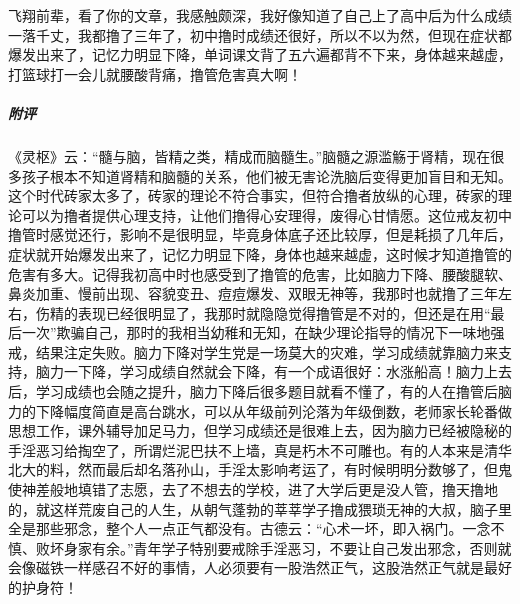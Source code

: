 \begin{case}
    飞翔前辈，看了你的文章，我感触颇深，我好像知道了自己上了高中后为什么成绩一落千丈，我都撸了三年了，初中撸时成绩还很好，所以不以为然，但现在症状都爆发出来了，记忆力明显下降，单词课文背了五六遍都背不下来，身体越来越虚，打篮球打一会儿就腰酸背痛，撸管危害真大啊！
    \subparagraph{附评} 《灵枢》云：“髓与脑，皆精之类，精成而脑髓生。”脑髓之源滥觞于肾精，现在很多孩子根本不知道肾精和脑髓的关系，他们被无害论洗脑后变得更加盲目和无知。这个时代砖家太多了，砖家的理论不符合事实，但符合撸者放纵的心理，砖家的理论可以为撸者提供心理支持，让他们撸得心安理得，废得心甘情愿。这位戒友初中撸管时感觉还行，影响不是很明显，毕竟身体底子还比较厚，但是耗损了几年后，症状就开始爆发出来了，记忆力明显下降，身体也越来越虚，这时候才知道撸管的危害有多大。记得我初高中时也感受到了撸管的危害，比如脑力下降、腰酸腿软、鼻炎加重、慢前出现、容貌变丑、痘痘爆发、双眼无神等，我那时也就撸了三年左右，伤精的表现已经很明显了，我那时就隐隐觉得撸管是不对的，但还是在用“最后一次”欺骗自己，那时的我相当幼稚和无知，在缺少理论指导的情况下一味地强戒，结果注定失败。脑力下降对学生党是一场莫大的灾难，学习成绩就靠脑力来支持，脑力一下降，学习成绩自然就会下降，有一个成语很好：水涨船高！脑力上去后，学习成绩也会随之提升，脑力下降后很多题目就看不懂了，有的人在撸管后脑力的下降幅度简直是高台跳水，可以从年级前列沦落为年级倒数，老师家长轮番做思想工作，课外辅导加足马力，但学习成绩还是很难上去，因为脑力已经被隐秘的手淫恶习给掏空了，所谓烂泥巴扶不上墙，真是朽木不可雕也。有的人本来是清华北大的料，然而最后却名落孙山，手淫太影响考运了，有时候明明分数够了，但鬼使神差般地填错了志愿，去了不想去的学校，进了大学后更是没人管，撸天撸地的，就这样荒废自己的人生，从朝气蓬勃的莘莘学子撸成猥琐无神的大叔，脑子里全是那些邪念，整个人一点正气都没有。古德云：“心术一坏，即入祸门。一念不慎、败坏身家有余。”青年学子特别要戒除手淫恶习，不要让自己发出邪念，否则就会像磁铁一样感召不好的事情，人必须要有一股浩然正气，这股浩然正气就是最好的护身符！
\end{case}


